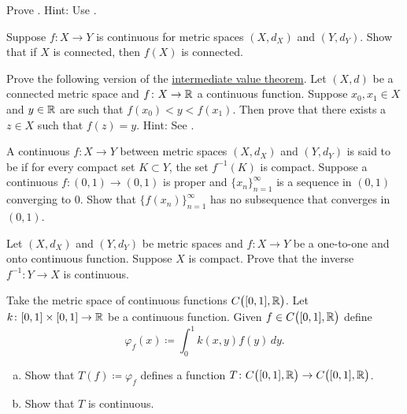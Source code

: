 \begin{exercise}
Prove .  Hint: Use .
\end{exercise}

\begin{exercise} \label{exercise:msconnconn}
Suppose $f \colon X \to Y$ is continuous for metric spaces $(X,d_X)$
and $(Y,d_Y)$.  Show that if $X$ is connected, then $f(X)$ is connected.
\end{exercise}

\begin{exercise}
Prove the following version of the
\hyperref[IVT:thm]{intermediate value theorem}.  Let $(X,d)$ be a connected
metric space and $f \colon X \to {\mathbb{R}}$ a continuous function.  Suppose 
$x_0,x_1 \in X$ and $y \in {\mathbb{R}}$ are such that $f(x_0) < y < f(x_1)$.
Then prove that there exists a $z \in X$ such that $f(z) = y$.
Hint: See .
\end{exercise}

\begin{exercise}
A continuous $f \colon X \to Y$ between metric spaces $(X,d_X)$ and
$(Y,d_Y)$ is said to be \emph{}
if for every compact set $K \subset Y$, the set $f^{-1}(K)$ is compact.
Suppose a continuous $f \colon (0,1) \to (0,1)$ is proper and
$\{ x_n \}_{n=1}^\infty$ is a sequence in $(0,1)$ converging to $0$.  Show that
$\bigl\{ f(x_n) \bigr\}_{n=1}^\infty$ has no subsequence that converges in $(0,1)$.
\end{exercise}

\begin{exercise}
Let $(X,d_X)$ and $(Y,d_Y)$ be metric spaces and
$f \colon X \to Y$ be a one-to-one and onto continuous function.  Suppose
$X$ is compact.  Prove that the inverse $f^{-1} \colon Y \to X$
is continuous.
\end{exercise}

\begin{exercise}
Take the metric space of continuous functions $C\bigl([0,1],{\mathbb{R}}\bigr)$.  Let
$k \colon [0,1] \times [0,1] \to {\mathbb{R}}$ be a continuous function.
Given $f \in C\bigl([0,1],{\mathbb{R}}\bigr)$ define
\begin{equation*}
\varphi_f(x) \coloneqq \int_0^1 k(x,y) f(y) \,dy .
\end{equation*}
\begin{enumerate}[a)]
\item
Show that $T(f) \coloneqq \varphi_f$ defines a function
$T \colon C\bigl([0,1],{\mathbb{R}}\bigr) \to C\bigl([0,1],{\mathbb{R}}\bigr)$.
\item
Show that $T$ is continuous.
\end{enumerate}
\end{exercise}

